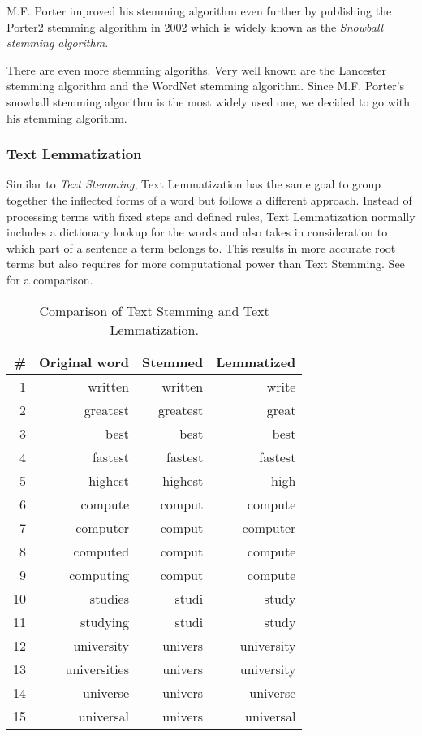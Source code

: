 M.F. Porter improved his stemming algorithm even further
by publishing the Porter2 stemming algorithm in 2002
which is widely known as the \textit{Snowball stemming algorithm}\cite{SnowballStemmerAlgorithm}.

There are even more stemming algoriths.
Very well known are the Lancester stemming algorithm\cite{LancesterStemmer}
and the WordNet stemming algorithm\cite{WordNetStemmer}.
Since M.F. Porter's snowball stemming algorithm is the most widely used one,
we decided to go with his stemming algorithm.

\subsubsection{Text Lemmatization}
\label{subsubsec:3_text_lemmatization}

Similar to \textit{Text Stemming}, Text Lemmatization has the same goal to group together the inflected forms of a word
but follows a different approach.
Instead of processing terms with fixed steps and defined rules,
Text Lemmatization normally includes a dictionary lookup for the words
and also takes in consideration to which part of a sentence a term belongs to.
This results in more accurate root terms but also requires for more computational power than Text Stemming.
See  for a comparison.

\begin{table}[h]
    \centering
    \begin{tabular}{|r|r|r|r|}
    \hline
    \textbf{\#} & \textbf{Original word} & \textbf{Stemmed} & \textbf{Lemmatized} \\ \hline
    1 & written & written & write \\ \hline
    2 & greatest & greatest & great \\ \hline
    3 & best & best & best \\ \hline
    4 & fastest & fastest & fastest \\ \hline
    5 & highest & highest & high \\ \hline
    6 & compute & comput & compute \\ \hline
    7 & computer & comput & computer \\ \hline
    8 & computed & comput & compute \\ \hline
    9 & computing & comput & compute \\ \hline
    10 & studies & studi & study \\ \hline
    11 & studying & studi & study \\ \hline
    12 & university & univers & university \\ \hline
    13 & universities & univers & university \\ \hline
    14 & universe & univers & universe \\ \hline
    15 & universal & univers & universal \\ \hline
    \end{tabular}
    \caption{Comparison of Text Stemming and Text Lemmatization.}
    \label{tab:comparison_stemming_lemmatization}
\end{table}

